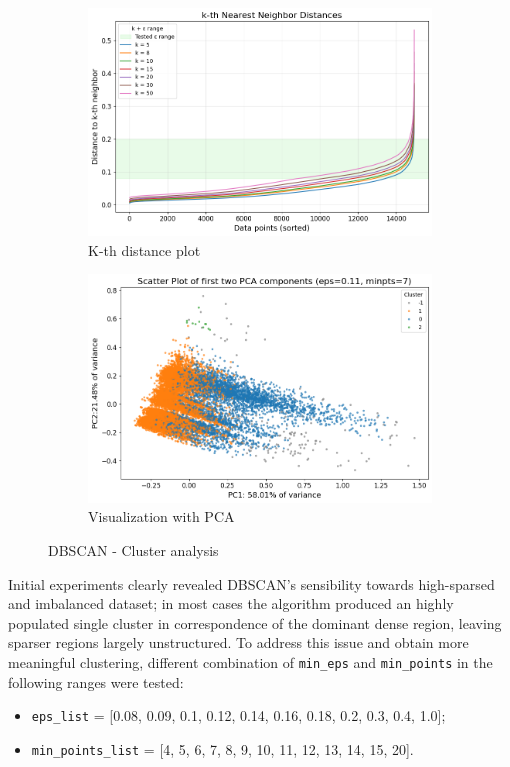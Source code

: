 \begin{figure}[H]
    \centering
    \begin{subfigure}[b]{0.48\textwidth}
        \centering
        \includegraphics[width=\textwidth]{plots/dbscan_kth.png}
        \caption{K-th distance plot}
        \label{fig:dbscan_kth}
    \end{subfigure}
    \begin{subfigure}[b]{0.48\textwidth}
        \centering
        \includegraphics[width=\textwidth]{plots/dbscan_scatterplot.png}
        \caption{Visualization with PCA}
        \label{fig:dbscan_visualization}
    \end{subfigure}
    \caption{DBSCAN - Cluster analysis}
    \label{fig:subplots_DBSCAN}
\end{figure}

Initial experiments clearly revealed DBSCAN's sensibility towards high-sparsed and imbalanced dataset;
in most cases the algorithm produced an highly populated single cluster in correspondence of the dominant dense region, leaving sparser regions largely unstructured. 
To address this issue and obtain more meaningful clustering, different combination of \texttt{min\_eps} and \texttt{min\_points} in the following ranges were tested:
\begin{itemize}
    \item \texttt{eps\_list} =  [0.08, 0.09, 0.1, 0.12, 0.14, 0.16, 0.18, 0.2, 0.3, 0.4, 1.0];
    \item \texttt{min\_points\_list} =  [4, 5, 6, 7, 8, 9, 10, 11, 12, 13, 14, 15, 20].
\end{itemize}

